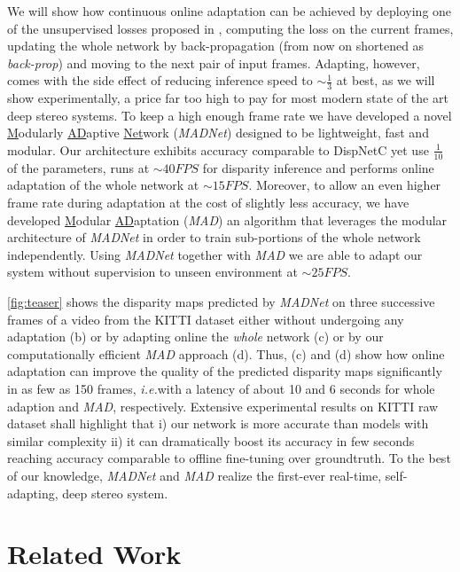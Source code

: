 \documentclass[10pt,twocolumn,letterpaper]{article}
\def\ie{\emph{i.e.}}
\def\netname{\emph{MADNet}}
\def\extendednetname{\underline{M}odularly \underline{AD}aptive \underline{Net}work}
\def\algoname{\emph{MAD}}
\def\extendedalgoname{\underline{M}odular \underline{AD}aptation}
\def\kitti{KITTI}
\begin{document}
We will show how continuous online adaptation can be achieved by deploying one of the unsupervised losses proposed in \cite{garg2016unsupervised,godard2017unsupervised,Tonioni_2017_ICCV,zhang2018activestereonet}, computing the loss on the current frames, updating the whole network by back-propagation (from now on shortened as \emph{back-prop}) and moving to the next pair of input frames. Adapting, however, comes with the side effect of reducing inference speed to $\sim\frac{1}{3}$ at best, as we will show experimentally, a price far too high to pay for most modern state of the art deep stereo systems. To keep a high enough frame rate we have developed a novel \extendednetname{} (\netname{}) designed to be lightweight, fast and modular. Our architecture exhibits accuracy comparable to DispNetC \cite{mayer2016large} yet use $\frac{1}{10}$ of the parameters, runs at $\sim40FPS$ for disparity inference and performs online adaptation of the whole network at $\sim15FPS$. Moreover, to allow an even higher frame rate during adaptation at the cost of slightly less accuracy, we have developed \extendedalgoname{} (\algoname{}) an algorithm that leverages the modular architecture of \netname{} in order to train sub-portions of the whole network independently. Using \netname{} together with \algoname{} we are able to adapt our system without supervision to unseen environment at $\sim25FPS$. 

\autoref{fig:teaser} shows the disparity maps predicted by \netname{} on three successive frames of a video from the \kitti{} dataset \cite{KITTI_RAW} either without undergoing any adaptation (b) or by adapting online the \emph{whole} network (c) or by our computationally efficient \algoname{} approach  (d). Thus, (c) and (d) show how online adaptation can improve the quality of the predicted disparity maps significantly in as few as 150 frames, \ie with a latency of about 10 and 6 seconds for whole adaption and \algoname{}, respectively. 
Extensive experimental results on KITTI raw dataset \cite{KITTI_RAW} shall highlight that i) our network is more accurate than models with similar complexity \cite{khamis2018stereonet} ii) it can dramatically boost its accuracy in few seconds reaching accuracy comparable to offline fine-tuning over groundtruth.
To the best of our knowledge, \netname{} and \algoname{} realize the first-ever real-time, self-adapting, deep stereo system. 

\section{Related Work}
\label{sec:related}
\end{document}
